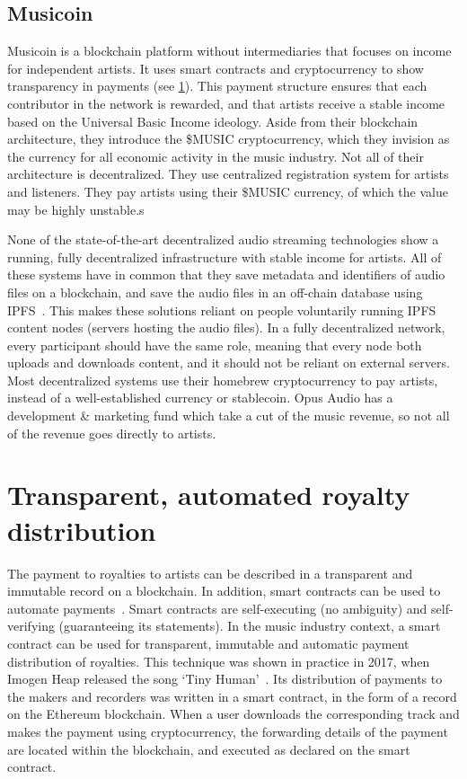 \subsection{Musicoin}
Musicoin is a blockchain platform without intermediaries that focuses on income for independent artists. It uses smart contracts and cryptocurrency to show transparency in payments (see \ref{sec:smart-contracts}). This payment structure ensures that each contributor in the network is rewarded, and that artists receive a stable income based on the Universal Basic Income ideology. Aside from their blockchain architecture, they introduce the \$MUSIC cryptocurrency, which they invision as the currency for all economic activity in the music industry. Not all of their architecture is decentralized. They use centralized registration system for artists and listeners. They pay artists using their \$MUSIC currency, of which the value may be highly unstable.s

None of the state-of-the-art decentralized audio streaming technologies show a running, fully decentralized infrastructure with stable income for artists. All of these systems have in common that they save metadata and identifiers of audio files on a blockchain, and save the audio files in an off-chain database using IPFS~\citep{benet2014ipfs}. This makes these solutions reliant on people voluntarily running IPFS content nodes (servers hosting the audio files). In a fully decentralized network, every participant should have the same role, meaning that every node both uploads and downloads content, and it should not be reliant on external servers. Most decentralized systems use their homebrew cryptocurrency to pay artists, instead of a well-established currency or stablecoin. Opus Audio has a development \& marketing fund which take a cut of the music revenue, so not all of the revenue goes directly to artists.

\section{Transparent, automated royalty distribution}
\label{sec:smart-contracts}
The payment to royalties to artists can be described in a transparent and immutable record on a blockchain. In addition, smart contracts can be used to automate payments~\citep{buterin2014next}. Smart contracts are self-executing (no ambiguity) and self-verifying (guaranteeing its statements). In the music industry context, a smart contract can be used for transparent, immutable and automatic payment distribution of royalties. This technique was shown in practice in 2017, when Imogen Heap released the song `Tiny Human'~\citep{heap2017blockchain}. Its distribution of payments to the makers and recorders was written in a smart contract, in the form of a record on the Ethereum blockchain. When a user downloads the corresponding track and makes the payment using cryptocurrency, the forwarding details of the payment are located within the blockchain, and executed as declared on the smart contract.

